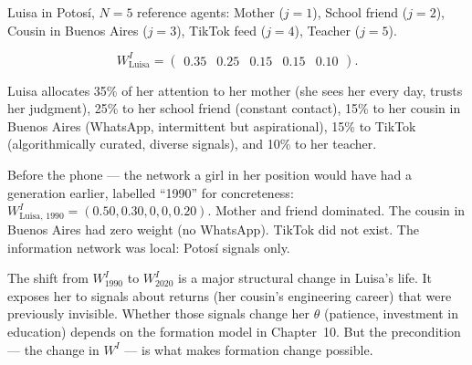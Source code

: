 \documentclass[../structural_economics_book.tex]{subfiles}
\begin{document}
\begin{example}\label{ch05:ex:Luisa}
Luisa in Potos\'{i}, $N = 5$ reference agents: Mother ($j=1$), School friend ($j=2$), Cousin in Buenos Aires ($j=3$), TikTok feed ($j=4$), Teacher ($j=5$).

\begin{equation}
W^I_{\text{Luisa}} = \begin{pmatrix} 0.35 & 0.25 & 0.15 & 0.15 & 0.10 \end{pmatrix}.
\end{equation}

Luisa allocates 35\% of her attention to her mother (she sees her every day, trusts her judgment), 25\% to her school friend (constant contact), 15\% to her cousin in Buenos Aires (WhatsApp, intermittent but aspirational), 15\% to TikTok (algorithmically curated, diverse signals), and 10\% to her teacher.

Before the phone --- the network a girl in her position would have had a generation earlier, labelled ``1990'' for concreteness: $W^I_{\text{Luisa, 1990}} = (0.50, 0.30, 0, 0, 0.20)$. Mother and friend dominated. The cousin in Buenos Aires had zero weight (no WhatsApp). TikTok did not exist. The information network was local: Potos\'{i} signals only.

The shift from $W^I_{1990}$ to $W^I_{2020}$ is a major structural change in Luisa's life. It exposes her to signals about returns (her cousin's engineering career) that were previously invisible. Whether those signals change her $\theta$ (patience, investment in education) depends on the formation model in Chapter~10. But the precondition --- the change in $W^I$ --- is what makes formation change possible.
\end{example}
\end{document}
